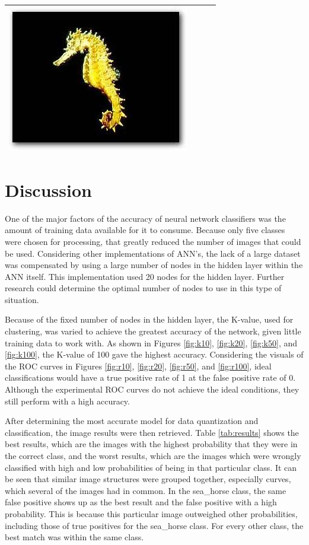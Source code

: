 \documentclass{article}
\begin{document}
\begin{table}[Ht]
\begin{tabular}{| c | c | c | c |}
\vspace{0cm}\includegraphics[scale=.15]{"Figures/False Matches/class_5_least_sure_wrong"} \\
\hline
\end{tabular}
\end{table}
%
\section{Discussion}
\label{sec:discussion}
One of the major factors of the accuracy of neural network classifiers was the amount of training data available for it to consume. Because only five classes were chosen for processing, that greatly reduced the number of images that could be used. Considering other implementations of ANN's, the lack of a large dataset was compensated by using a large number of nodes in the hidden layer within the ANN itself. This implementation used 20 nodes for the hidden layer. Further research could determine the optimal number of nodes to use in this type of situation. 

Because of the fixed number of nodes in the hidden layer, the K-value, used for clustering, was varied to achieve the greatest accuracy of the network, given little training data to work with. As shown in Figures \ref{fig:k10}, \ref{fig:k20}, \ref{fig:k50}, and \ref{fig:k100}, the K-value of 100 gave the highest accuracy. Considering the visuals of the ROC curves in Figures \ref{fig:r10}, \ref{fig:r20}, \ref{fig:r50}, and \ref{fig:r100}, ideal classifications would have a true positive rate of 1 at the false positive rate of 0. Although the experimental ROC curves do not achieve the ideal conditions, they still perform with a high accuracy.

After determining the most accurate model for data quantization and classification, the image results were then retrieved. Table \ref{tab:results} shows the best results, which are the images with the highest probability that they were in the correct class, and the worst results, which are the images which were wrongly classified with high and low probabilities of being in that particular class. It can be seen that similar image structures were grouped together, especially curves, which several of the images had in common. In the sea\_horse class, the same false positive shows up as the best result and the false positive with a high probability. This is because this particular image outweighed other probabilities, including those of true positives for the sea\_horse class. For every other class, the best match was within the same class.
\end{document}
